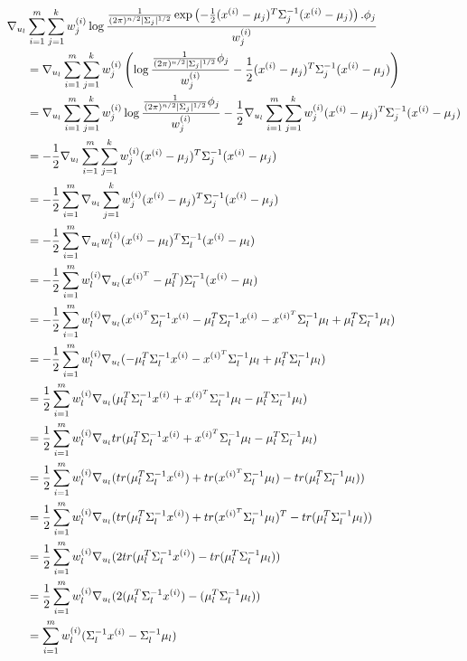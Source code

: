 \begin{align}
\nabla_{u_l} & \sum_{i=1}^{m} \sum_{j=1}^{k} w_{j}^{(i)} \log
\frac{\frac{1}{(2\pi)^{n/2}|\Sigma_j|^{1/2}}\exp\left( -\frac{1}{2}
(x^{(i)}-\mu_j)^T \Sigma_j^{-1} (x^{(i)}-\mu_j)
\right).\phi_j}{w_{j}^{(i)}}\notag\\
& =  \nabla_{u_l} \sum_{i=1}^{m} \sum_{j=1}^{k} w_{j}^{(i)} \left( \log
\frac{\frac{1}{(2\pi)^{n/2}|\Sigma_j|^{1/2}}\phi_j }{w_{j}^{(i)}} -\frac{1}{2}
(x^{(i)}-\mu_j)^T \Sigma_j^{-1} (x^{(i)}-\mu_j) \right)\notag\\
& = \nabla_{u_l} \sum_{i=1}^{m} \sum_{j=1}^{k} w_{j}^{(i)} \log
\frac{\frac{1}{(2\pi)^{n/2}|\Sigma_j|^{1/2}}\phi_j }{w_{j}^{(i)}} -\frac{1}{2}
\nabla_{u_l} \sum_{i=1}^{m} \sum_{j=1}^{k} w_{j}^{(i)} (x^{(i)}-\mu_j)^T
\Sigma_j^{-1} (x^{(i)}-\mu_j)\notag\\
& = -\frac{1}{2} \nabla_{u_l} \sum_{i=1}^{m} \sum_{j=1}^{k} w_{j}^{(i)}
(x^{(i)}-\mu_j)^T \Sigma_j^{-1} (x^{(i)}-\mu_j)\notag\\
& = -\frac{1}{2} \sum_{i=1}^{m} \nabla_{u_l} \sum_{j=1}^{k} w_{j}^{(i)}
(x^{(i)}-\mu_j)^T \Sigma_j^{-1} (x^{(i)}-\mu_j)\notag\\
& = -\frac{1}{2} \sum_{i=1}^{m} \nabla_{u_l} w_{l}^{(i)}
(x^{(i)}-\mu_l)^T \Sigma_l^{-1} (x^{(i)}-\mu_l)\notag\\
& = -\frac{1}{2} \sum_{i=1}^{m} w_{l}^{(i)} \nabla_{u_l} 
(x^{(i)^T}-\mu_l^T) \Sigma_l^{-1} (x^{(i)}-\mu_l)\notag\\
& = -\frac{1}{2} \sum_{i=1}^{m} w_{l}^{(i)} \nabla_{u_l} (x^{(i)^T} \Sigma_l^{-1}
x^{(i)} - \mu_l^T \Sigma_l^{-1} x^{(i)} - x^{(i)^T} \Sigma_l^{-1} \mu_l + \mu_l^T
\Sigma_l^{-1} \mu_l)\notag\\
& = -\frac{1}{2} \sum_{i=1}^{m} w_{l}^{(i)} \nabla_{u_l} (- \mu_l^T \Sigma_l^{-1}
x^{(i)} - x^{(i)^T} \Sigma_l^{-1} \mu_l + \mu_l^T
\Sigma_l^{-1} \mu_l)\notag\\
& = \frac{1}{2} \sum_{i=1}^{m} w_{l}^{(i)} \nabla_{u_l} ( \mu_l^T \Sigma_l^{-1}
x^{(i)} + x^{(i)^T} \Sigma_l^{-1} \mu_l - \mu_l^T
\Sigma_l^{-1} \mu_l)\notag\\
& = \frac{1}{2} \sum_{i=1}^{m} w_{l}^{(i)} \nabla_{u_l} tr( \mu_l^T \Sigma_l^{-1}
x^{(i)} + x^{(i)^T} \Sigma_l^{-1} \mu_l - \mu_l^T
\Sigma_l^{-1} \mu_l)\notag\\
& = \frac{1}{2} \sum_{i=1}^{m} w_{l}^{(i)} \nabla_{u_l} (tr(\mu_l^T \Sigma_l^{-1}
x^{(i)}) + tr(x^{(i)^T} \Sigma_l^{-1} \mu_l) - tr(\mu_l^T
\Sigma_l^{-1} \mu_l))\notag\\
& = \frac{1}{2} \sum_{i=1}^{m} w_{l}^{(i)} \nabla_{u_l} (tr(\mu_l^T \Sigma_l^{-1}
x^{(i)}) + tr(x^{(i)^T} \Sigma_l^{-1} \mu_l)^T - tr(\mu_l^T
\Sigma_l^{-1} \mu_l))\notag\\
& = \frac{1}{2} \sum_{i=1}^{m} w_{l}^{(i)} \nabla_{u_l} (2tr(\mu_l^T \Sigma_l^{-1}
x^{(i)}) - tr(\mu_l^T \Sigma_l^{-1} \mu_l))\notag\\
& = \frac{1}{2} \sum_{i=1}^{m} w_{l}^{(i)} \nabla_{u_l} (2(\mu_l^T \Sigma_l^{-1}
x^{(i)}) - (\mu_l^T \Sigma_l^{-1} \mu_l))\notag\\
& = \sum_{i=1}^{m} w_{l}^{(i)} (\Sigma_l^{-1}
x^{(i)} - \Sigma_l^{-1} \mu_l)\notag
\end{align}
